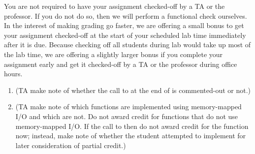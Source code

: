 You are not required to have your assignment checked-off by a TA or the professor.
If you do not do so, then we will perform a functional check ourselves.
In the interest of making grading go faster, we are offering a small bonus to get your assignment checked-off at the start of your scheduled lab time immediately after it is due.
Because checking off all students during lab would take up most of the lab time, we are offering a slightly larger bonus if you complete your assignment early and get it checked-off by a TA or the professor during office hours.

\begin{enumerate}


    \item [] (TA make note of whether the call to  at the end of  is commented-out or not.)
    \item [] (TA make note of which functions are implemented using memory-mapped I/O and which are not.
        Do not award credit for functions that do not use memory-mapped I/O.
        If the call to  then do not award credit for the  function now;
        instead, make note of whether the student attempted to implement  for later consideration of partial credit.)


\end{enumerate}

